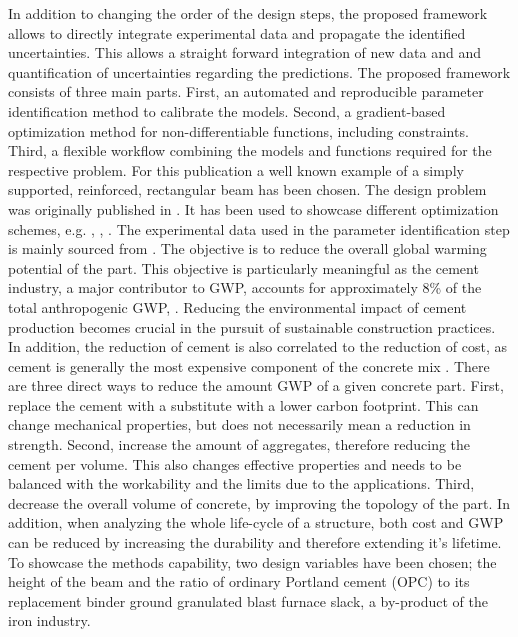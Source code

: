 In addition to changing the order of the design steps, the proposed framework allows to directly integrate experimental data and propagate the identified uncertainties.
This allows a straight forward integration of new data and and quantification of uncertainties regarding the predictions.
The proposed framework consists of three main parts.
First, an automated and reproducible parameter identification method to calibrate the models.
Second, a gradient-based optimization method for non-differentiable functions, including constraints.
Third, a flexible workflow combining the models and functions required for the respective problem. 
For this publication a well known example of a simply supported, reinforced, rectangular beam  has been chosen.
The design problem was originally published in \cite{everard1966reinforced}.
It has been used to showcase different optimization schemes, e.g. \cite{Chakrabarty_1992}, \cite{Coello_1997}, \cite{Pierott_2021}.
The experimental data used in the parameter identification step is mainly sourced from \cite{gruyaert2011}.
The objective is to reduce the overall global warming potential of the part.
This objective is particularly meaningful as the cement industry, a major contributor to GWP, accounts for approximately 8\% of the total anthropogenic GWP, \cite{Miller_2016}.
Reducing the environmental impact of cement production becomes crucial in the pursuit of sustainable construction practices.
In addition, the reduction of cement is also correlated to the reduction of cost, as cement is generally the most expensive component of the concrete mix \cite{Paya_Zaforteza_2009}.
There are three direct ways to reduce the amount GWP of a given concrete part.
First, replace the cement with a substitute with a lower carbon footprint.
This can change mechanical properties, but does not necessarily mean a reduction in strength.
Second, increase the amount of aggregates, therefore reducing the cement per volume.
This also changes effective properties and needs to be balanced with the workability and the limits due to the applications.
Third, decrease the overall volume of concrete, by improving the topology of the part.
In addition, when analyzing the whole life-cycle of a structure, both cost and GWP can be reduced by increasing the durability and therefore extending it's lifetime.
To showcase the methods capability, two design variables have been chosen; the height of the beam and the ratio of ordinary Portland cement (OPC) to its replacement binder ground granulated blast furnace slack, a by-product of the iron industry.\\
